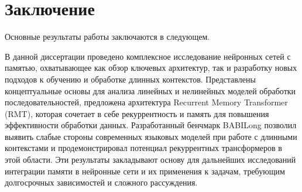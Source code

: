 \chapter*{Заключение}                       %


Основные результаты работы заключаются в следующем.

В данной диссертации проведено комплексное исследование нейронных сетей с памятью, охватывающее как обзор ключевых архитектур, так и разработку новых подходов к обучению и обработке длинных контекстов. Представлены концептуальные основы для анализа линейных и нелинейных моделей обработки последовательностей, предложена архитектура Recurrent Memory Transformer (RMT), которая сочетает в себе рекуррентность и память для повышения эффективности обработки данных. Разработанный бенчмарк BABILong позволил выявить слабые стороны современных языковых моделей при работе с длинными контекстами и продемонстрировал потенциал рекуррентных трансформеров в этой области. Эти результаты закладывают основу для дальнейших исследований интеграции памяти в нейронные сети и их применения к задачам, требующим долгосрочных зависимостей и сложного рассуждения.

